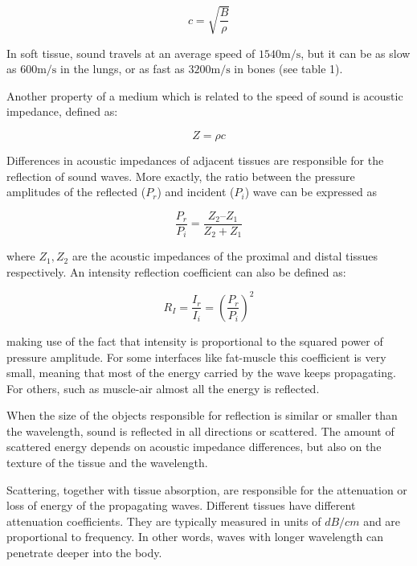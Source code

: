 \documentclass[11pt]{article} %
\begin{document}
	\[  c = \sqrt{ \frac{B}{\rho} } \]
	
	In soft tissue, sound travels at an average speed of $ 1540 \si{\meter\per\second} $, but it can be as slow as $ 600 \si{\meter\per\second} $ in the lungs, or as fast as $ 3200 \si{\meter\per\second} $ in bones (see table 1). 
	
	
	Another property of a medium which is related to the speed of sound is acoustic impedance, defined as: 	
	
	\[ Z = \rho c \]
	 	
	Differences in acoustic impedances of adjacent tissues are responsible for the reflection of sound waves. More exactly, the ratio between the pressure amplitudes of the reflected ($P_r$) and incident ($P_i$) wave can be expressed as	
	
	\[ \frac{P_r}{P_i} = \frac{Z_2 – Z_1}{Z_2 + Z_1} \]	
	
	where $Z_1, Z_2$ are the acoustic impedances of the proximal and distal tissues respectively. An intensity reflection coefficient can also be defined as: 	
	
	\[ R_I = \frac{I_r}{I_i} = \left( \frac{P_r}{P_i} \right)^2 \]	
	
	making use of the fact that intensity is proportional to the squared power of pressure amplitude. For some interfaces like fat-muscle this coefficient is very small, meaning that most of the energy carried by the wave keeps propagating. For others, such as muscle-air almost all the energy is reflected.

	
	When the size of the objects responsible for reflection is similar or smaller than the wavelength, sound is reflected in all directions or scattered. The amount of scattered energy depends on acoustic impedance differences, but also on the texture of the tissue and the wavelength.

	
	Scattering, together with tissue absorption, are responsible for the attenuation or loss of energy of the propagating waves. Different tissues have different attenuation coefficients. They are typically measured in units of $dB/cm$ and are proportional to frequency. In other words, waves with longer wavelength can penetrate deeper into the body. \cite{bushberg}
\end{document}
